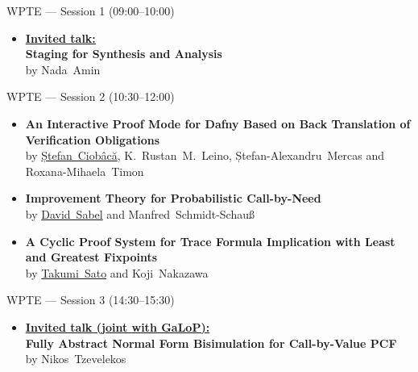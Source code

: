 \documentclass[11pt]{beamer}
\newcommand{\sessionbreaktext}{}
\newenvironment{sessionframe}[2]{%
  \renewcommand{\sessionbreaktext}{#2}%
  \begin{frame}[t]{#1}%
}{%
  \end{frame}%
}
\begin{document}
\begin{sessionframe}{WPTE --- Session 1 (09:00--10:00)}{Break: 10:00--10:30 (coffee)}
  \vspace*{\fill}
  \begin{itemize}
    \item \underline{\textbf{Invited talk:}}\\[1ex]
      \textbf{Staging for Synthesis and Analysis}\\
      by \mbox{Nada Amin}
  \end{itemize}
\end{sessionframe}

\begin{sessionframe}{WPTE --- Session 2 (10:30--12:00)}{Break: 12:00--14:30 (lunch until 14:00)}
  \vspace*{\fill}
  \begin{itemize}
    \item \textbf{An Interactive Proof Mode for Dafny Based on Back Translation of Verification Obligations}\\
      by \mbox{\underline{Ștefan Ciobâcă}}, \mbox{K. Rustan M. Leino}, \mbox{Ștefan-Alexandru Mercas} and \mbox{Roxana-Mihaela Timon}
    \vspace*{\fill}
    \item \textbf{Improvement Theory for Probabilistic Call-by-Need}\\
      by \mbox{\underline{David Sabel}} and \mbox{Manfred Schmidt-Schauß}
    \vspace*{\fill}
    \item \textbf{A Cyclic Proof System for Trace Formula Implication with Least and Greatest Fixpoints}\\
      by \mbox{\underline{Takumi Sato}} and \mbox{Koji Nakazawa}
  \end{itemize}
\end{sessionframe}

\begin{sessionframe}{WPTE --- Session 3 (14:30--15:30)}{Break: 15:30--16:00 (coffee)}
  \vspace*{\fill}
  \begin{itemize}
    \item \underline{\textbf{Invited talk (joint with GaLoP):}}\\[1ex]
      \textbf{Fully Abstract Normal Form Bisimulation for Call-by-Value PCF}\\
      by \mbox{Nikos Tzevelekos}
  \end{itemize}
\end{sessionframe}
\end{document}
